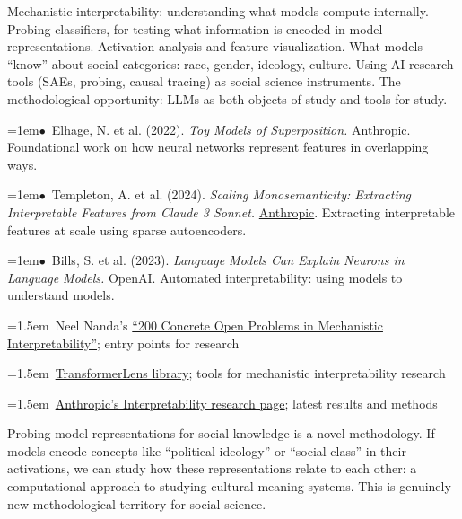\documentclass[11pt, a4paper]{article}
\newcommand{\seclabel}[1]{%
  \vspace{0.6em}{\normalsize\sffamily\bfseries\textcolor{accent}{#1}}\par\vspace{0.2em}
}
\newcommand{\refpaper}[1]{%
  \par\hangindent=1em\hangafter=1\noindent\textcolor{accent}{\small$\bullet$}~{\small #1}\par
}
\newcommand{\resource}[1]{%
  \par\hangindent=1.5em\hangafter=1\noindent\hspace{0.5em}{\small\textcolor{accent}{\guilsinglright}}~{\small #1}\par
}
\begin{document}
\seclabel{Core Concepts}

Mechanistic interpretability: understanding what models compute internally. Probing classifiers, for testing what information is encoded in model representations. Activation analysis and feature visualization. What models ``know'' about social categories: race, gender, ideology, culture. Using AI research tools (SAEs, probing, causal tracing) as social science instruments. The methodological opportunity: LLMs as both objects of study and tools for study.

\seclabel{Core Readings}

\refpaper{Elhage, N. et al. (2022). \textit{Toy Models of Superposition.} Anthropic. Foundational work on how neural networks represent features in overlapping ways.}

\refpaper{Templeton, A. et al. (2024). \textit{Scaling Monosemanticity: Extracting Interpretable Features from Claude 3 Sonnet.} \href{https://www.anthropic.com/research/mapping-mind-language-model}{Anthropic}. Extracting interpretable features at scale using sparse autoencoders.}

\refpaper{Bills, S. et al. (2023). \textit{Language Models Can Explain Neurons in Language Models.} OpenAI. Automated interpretability: using models to understand models.}

\seclabel{Further Resources}

\resource{Neel Nanda's \href{https://www.alignmentforum.org/s/yivyHaCAmMJ3CqSyj}{``200 Concrete Open Problems in Mechanistic Interpretability''}; entry points for research}

\resource{\href{https://github.com/neelnanda-io/TransformerLens}{TransformerLens library}; tools for mechanistic interpretability research}

\resource{\href{https://www.anthropic.com/research}{Anthropic's Interpretability research page}; latest results and methods}

\begin{appblock}
Probing model representations for social knowledge is a novel methodology. If models encode concepts like ``political ideology'' or ``social class'' in their activations, we can study how these representations relate to each other: a computational approach to studying cultural meaning systems. This is genuinely new methodological territory for social science.
\end{appblock}

\vspace{1.5em}
\end{document}
